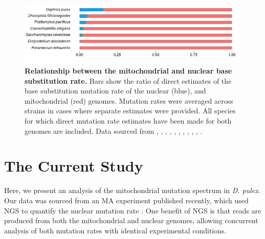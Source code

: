 \documentclass[12pt,twoside]{reedthesis}
\begin{document}

\begin{figure}[h]
    \begin{center}
        \includegraphics[scale=0.6]{../figures/nuc_mit_rate_comparison.jpeg}
    \end{center}
    \caption[Relationship between the mitochondrial and nuclear base substitution rate]{\textbf{Relationship between the mitochondrial and nuclear base substitution rate.} Bars show the ratio of direct estimates of the base substitution mutation rate of the nuclear (blue), and mitochondrial (red) genomes. Mutation rates were averaged across strains in cases where separate estimates were provided. All species for which direct mutation rate estimates have been made for both genomes are included. Data sourced from \cite{denver_high_2000}, \cite{lynch_genome-wide_2008}, \cite{haag-liautard_direct_2008}, \cite{denver_genome-wide_2009}, \cite{keightley_analysis_2009}, \cite{molnar_mutation_2011}, \cite{saxer_whole_2012}, \cite{sung_extraordinary_2012}, \cite{xu_high_2012}, \cite{weller_opposing_2014}, \cite{keith_high_2015}.}
    \label{nuc_mit_rate_comparison}
\end{figure}

\section{The Current Study}
Here, we present an analysis of the mitochondrial mutation spectrum in \textit{D. pulex}.
Our data was sourced from an \gls{MA} experiment published recently, which used \gls{NGS} to quantify the nuclear mutation rate \citep{keith_high_2015}.
One benefit of \gls{NGS} is that reads are produced from both the mitochondrial and nuclear genomes, allowing concurrent analysis of both mutation rates with identical experimental conditions.
\end{document}
